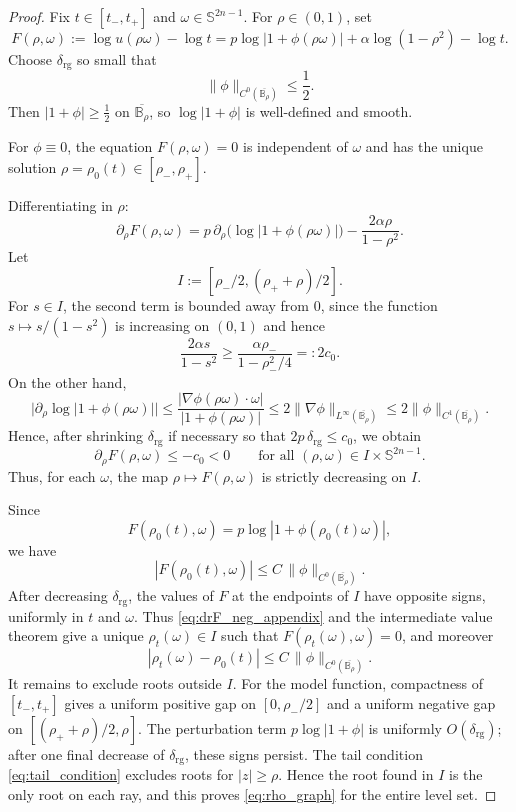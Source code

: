 \documentclass[10pt,a4paper]{amsart}
\newcommand{\B}{\mathbb{B}}
\newcommand{\Sn}{\mathbb{S}^{2n-1}}
\begin{document}
\begin{proof}
Fix \(t\in[t_-,t_+]\) and \(\omega\in\Sn\). For \(\rho\in(0,1)\), set
\[
F(\rho,\omega):=\log u(\rho\omega)-\log t
=
p\log|1+\phi(\rho\omega)|+\alpha\log(1-\rho^2)-\log t.
\]
Choose \(\delta_{\mathrm{rg}}\) so small that
\[
\|\phi\|_{C^0(\overline{\B_\rho})}\le \frac12.
\]
Then \(|1+\phi|\ge \frac12\) on \(\overline{\B_\rho}\), so \(\log|1+\phi|\) is well-defined and smooth.

For \(\phi\equiv 0\), the equation \(F(\rho,\omega)=0\) is independent of \(\omega\) and has the unique solution
\(\rho=\rho_0(t)\in[\rho_-,\rho_+]\).

Differentiating in \(\rho\):
\[
\partial_\rho F(\rho,\omega)
=
p\,\partial_\rho\bigl(\log|1+\phi(\rho\omega)|\bigr)
-\frac{2\alpha\rho}{1-\rho^2}.
\]
Let
\[
I:=[\rho_-/2,(\rho_++\rho)/2].
\]
For $s\in I$, the second term is bounded away from $0$, since the function
$s\mapsto s/(1-s^2)$ is increasing on $(0,1)$ and hence
\[
\frac{2\alpha s}{1-s^2}
\ge
\frac{\alpha\rho_-}{1-\rho_-^2/4}
=:2c_0.
\]
On the other hand,
\[
\bigl|\partial_\rho\log|1+\phi(\rho\omega)|\bigr|
\le
\frac{|\nabla\phi(\rho\omega)\cdot\omega|}{|1+\phi(\rho\omega)|}
\le
2\|\nabla\phi\|_{L^\infty(\overline{\B_\rho})}
\le
2\|\phi\|_{C^1(\overline{\B_\rho})}.
\]
Hence, after shrinking \(\delta_{\mathrm{rg}}\) if necessary so that \(2p\,\delta_{\mathrm{rg}}\le c_0\), we obtain
\begin{equation}\label{eq:drF_neg_appendix}
\partial_\rho F(\rho,\omega)\le -c_0<0
\qquad\text{for all }(\rho,\omega)\in I\times\Sn.
\end{equation}
Thus, for each \(\omega\), the map \(\rho\mapsto F(\rho,\omega)\) is strictly decreasing on \(I\).

Since
\[
F(\rho_0(t),\omega)=p\log|1+\phi(\rho_0(t)\omega)|,
\]
we have
\[
|F(\rho_0(t),\omega)|
\le
C\,\|\phi\|_{C^0(\overline{\B_\rho})}.
\]
After decreasing $\delta_{\mathrm{rg}}$, the values of $F$ at the endpoints of
$I$ have opposite signs, uniformly in $t$ and $\omega$.  Thus
\eqref{eq:drF_neg_appendix} and the intermediate value theorem give a unique
\(\rho_t(\omega)\in I\) such that \(F(\rho_t(\omega),\omega)=0\), and moreover
\begin{equation}\label{eq:rho_Linf_est_appendix}
|\rho_t(\omega)-\rho_0(t)|
\le
C\,\|\phi\|_{C^0(\overline{\B_\rho})}.
\end{equation}
It remains to exclude roots outside $I$. For the model function, compactness
of $[t_-,t_+]$ gives a uniform positive gap on
$[0,\rho_-/2]$ and a uniform negative gap on
$[(\rho_++\rho)/2,\rho]$. The perturbation term
$p\log|1+\phi|$ is uniformly $O(\delta_{\mathrm{rg}})$; after one final
decrease of $\delta_{\mathrm{rg}}$, these signs persist. The tail condition
\eqref{eq:tail_condition} excludes roots for $|z|\ge\rho$. Hence the root
found in $I$ is the only root on each ray, and this proves
\eqref{eq:rho_graph} for the entire level set.


\end{proof}
\end{document}
